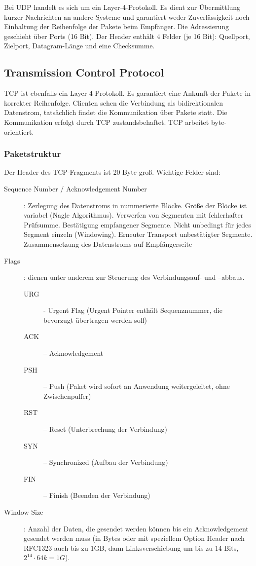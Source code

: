\documentclass{article} %
\begin{document}
Bei UDP handelt es sich um ein Layer-4-Protokoll.\cite{rfc768}
Es dient zur Übermittlung kurzer Nachrichten an andere Systeme und garantiert weder Zuverlässigkeit noch Einhaltung der Reihenfolge der Pakete beim Empfänger.
Die Adressierung geschieht über Ports (16 Bit).
Der Header enthält 4 Felder (je 16 Bit): Quellport, Zielport, Datagram-Länge und eine Checksumme.

\subsection{Transmission Control Protocol}
TCP ist ebenfalls ein Layer-4-Protokoll.\cite{rfc793}
Es garantiert eine Ankunft der Pakete in korrekter Reihenfolge.
Clienten sehen die Verbindung als bidirektionalen Datenstrom, tatsächlich findet die Kommunikation über Pakete statt. Die Kommunikation erfolgt durch TCP zustandsbehaftet.
TCP arbeitet byte-orientiert.

\subsubsection{Paketstruktur}

Der Header des TCP-Fragments ist 20 Byte groß.
Wichtige Felder sind:
\begin{description}
	\item [Sequence Number / Acknowledgement Number]: Zerlegung des Datenstroms in nummerierte Blöcke.
	Größe der Blöcke ist variabel (Nagle Algorithmus).
	Verwerfen von Segmenten mit fehlerhafter Prüfsumme.
	Bestätigung empfangener Segmente.
	Nicht unbedingt für jedes Segment einzeln (Windowing).
	Erneuter Transport unbestätigter Segmente.
	Zusammensetzung des Datenstroms auf Empfängerseite
	
	\item [Flags]: dienen unter anderem zur Steuerung des Verbindungsauf- und –abbaus.
	\begin{description}
		\item [URG] - Urgent Flag (Urgent Pointer enthält
			Sequenznummer, die bevorzugt übertragen werden soll)
		\item [ACK] – Acknowledgement
		\item [PSH] – Push (Paket wird sofort an Anwendung weitergeleitet, ohne Zwischenpuffer)
		\item [RST] – Reset (Unterbrechung der Verbindung)
		\item [SYN] – Synchronized (Aufbau der Verbindung)
		\item [FIN] – Finish (Beenden der Verbindung)
	\end{description}
	\item [Window Size]: Anzahl der Daten, die gesendet werden können bis ein Acknowledgement gesendet werden muss (in Bytes oder mit speziellem Option Header nach RFC1323 \cite{rfc1323} auch bis zu 1GB,	dann Linksverschiebung um bis zu 14 Bits, $2^{14} \cdot 64k = 1G$).
\end{description}
\end{document}
